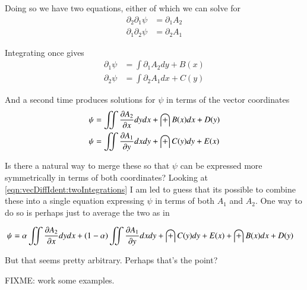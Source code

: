 Doing so we have two equations, either of which we can solve for
\begin{align*}
\partial_2 \partial_1 \psi &= \partial_1 A_2 \\
\partial_1 \partial_2 \psi &= \partial_2 A_1 
\end{align*}

Integrating once gives
\begin{align*}
\partial_1 \psi &= \int \partial_1 A_2 dy + B(x) \\
\partial_2 \psi &= \int \partial_2 A_1 dx + C(y)
\end{align*}

And a second time produces solutions for $\psi$ in terms of the vector coordinates
\begin{align}\label{eqn:vecDiffIdent:twoIntegrations}
\psi &= \iint \PD{x}{A_2} dy dx + \int B(x) dx + D(y) \\
\psi &= \iint \PD{y}{A_1} dx dy + \int C(y) dy + E(x)
\end{align}

Is there a natural way to merge these so that $\psi$ can be expressed more symmetrically in terms of both coordinates?  
Looking at \ref{eqn:vecDiffIdent:twoIntegrations} I am led to guess that its possible to 
combine these into a single equation expressing $\psi$ in terms of both $A_1$ and $A_2$.  One way to do so is perhaps just to average the
two as in

\begin{align*}
\psi &= \alpha \iint \PD{x}{A_2} dy dx + (1-\alpha) \iint \PD{y}{A_1} dx dy + \int C(y) dy + E(x) + \int B(x) dx + D(y) 
\end{align*}

But that seems pretty arbitrary.  Perhaps that's the point?

FIXME: work some examples.



%
%
%

